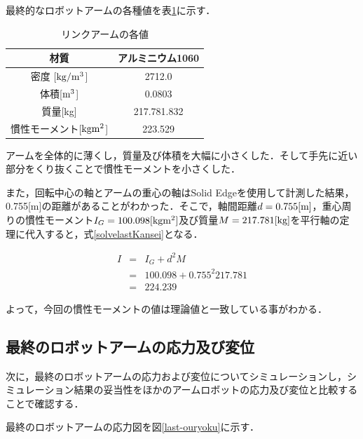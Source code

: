 最終的なロボットアームの各種値を表\ref{last-robot-data}に示す．

\begin{table}[htb]
\caption[]{リンクアームの各値}
  \begin{center}
    \begin{tabular}{|c|c|} \hline
      材質 & アルミニウム1060 \\ \hline
      密度 [$\rm kg/m^3$]& 2712.0 \\ \hline
      体積[$\rm m^3$] & 0.0803 \\ \hline
      質量[kg] & 217.781.832 \\ \hline
      慣性モーメント[$\rm kg m^2$] & 223.529  \\ \hline
    \end{tabular}
    \label{last-robot-data}
  \end{center}
\end{table}

アームを全体的に薄くし，質量及び体積を大幅に小さくした．そして手先に近い部分をくり抜くことで慣性モーメントを小さくした．

また，回転中心の軸とアームの重心の軸はSolid
Edgeを使用して計測した結果，0.755{[}m{]}の距離があることがわかった．そこで，軸間距離\(d=0.755[\rm m]\)，重心周りの慣性モーメント\(I_G=100.098[\rm kgm^2]\)及び質量\(M=217.781[\rm kg]\)を平行軸の定理に代入すると，式\ref{solvelastKansei}となる．

\begin{eqnarray}
  I &=& I_G+d^2M \nonumber \\
    &=& 100.098 + 0.755^{2} 217.781 \nonumber \\
    &=& 224.239
  \label{solvelastKansei}
\end{eqnarray}

よって，今回の慣性モーメントの値は理論値と一致している事がわかる．

\subsection{最終のロボットアームの応力及び変位}\label{ux6700ux7d42ux306eux30edux30dcux30c3ux30c8ux30a2ux30fcux30e0ux306eux5fdcux529bux53caux3073ux5909ux4f4d}

次に，最終のロボットアームの応力および変位についてシミュレーションし，シミュレーション結果の妥当性をほかのアームロボットの応力及び変位と比較することで確認する．

最終のロボットアームの応力図を図\ref{last-ouryoku}に示す．

